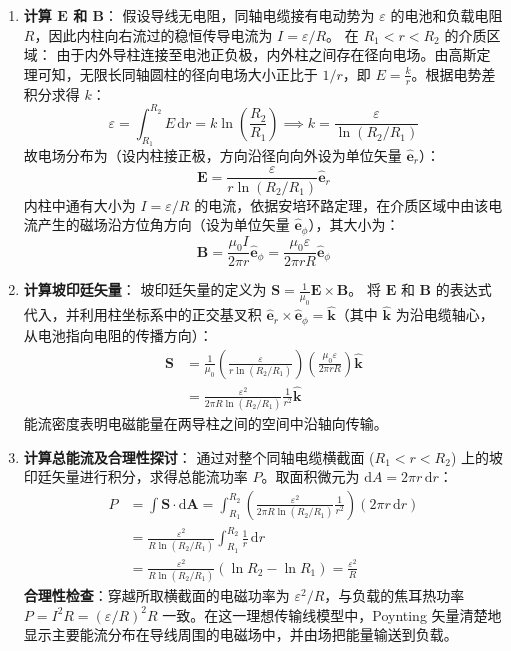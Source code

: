 \begin{solution}
\begin{enumerate}
    \item[(a)] \textbf{计算 $\boldsymbol{E}$ 和 $\boldsymbol{B}$}：
    假设导线无电阻，同轴电缆接有电动势为 $\varepsilon$ 的电池和负载电阻 $R$，因此内柱向右流过的稳恒传导电流为 $I = \varepsilon / R$。
    在 $R_1 < r < R_2$ 的介质区域：
    由于内外导柱连接至电池正负极，内外柱之间存在径向电场。由高斯定理可知，无限长同轴圆柱的径向电场大小正比于 $1/r$，即 $E = \frac{k}{r}$。根据电势差积分求得 $k$：
    $$ \varepsilon = \int_{R_1}^{R_2} E \, \mathrm{d}r = k \ln\left(\frac{R_2}{R_1}\right) \implies k = \frac{\varepsilon}{\ln(R_2/R_1)} $$
    故电场分布为（设内柱接正极，方向沿径向向外设为单位矢量 $\hat{\boldsymbol{e}}_r$）：
    $$ \boldsymbol{E} = \frac{\varepsilon}{r \ln(R_2/R_1)} \hat{\boldsymbol{e}}_r $$
    内柱中通有大小为 $I = \varepsilon / R$ 的电流，依据安培环路定理，在介质区域中由该电流产生的磁场沿方位角方向（设为单位矢量 $\hat{\boldsymbol{e}}_\phi$），其大小为：
    $$ \boldsymbol{B} = \frac{\mu_0 I}{2\pi r} \hat{\boldsymbol{e}}_\phi = \frac{\mu_0 \varepsilon}{2\pi r R} \hat{\boldsymbol{e}}_\phi $$

    \item[(b)] \textbf{计算坡印廷矢量}：
    坡印廷矢量的定义为 $\boldsymbol{S} = \frac{1}{\mu_0} \boldsymbol{E} \times \boldsymbol{B}$。
    将 $\boldsymbol{E}$ 和 $\boldsymbol{B}$ 的表达式代入，并利用柱坐标系中的正交基叉积 $\hat{\boldsymbol{e}}_r \times \hat{\boldsymbol{e}}_\phi = \hat{\boldsymbol{k}}$（其中 $\hat{\boldsymbol{k}}$ 为沿电缆轴心，从电池指向电阻的传播方向）：
    \[
    \begin{aligned}
    \boldsymbol{S} &= \frac{1}{\mu_0} \left( \frac{\varepsilon}{r \ln(R_2/R_1)} \right) \left( \frac{\mu_0 \varepsilon}{2\pi r R} \right) \hat{\boldsymbol{k}}\\
      &= \frac{\varepsilon^2}{2\pi R \ln(R_2/R_1)} \frac{1}{r^2} \hat{\boldsymbol{k}}
    \end{aligned}
    \]
    能流密度表明电磁能量在两导柱之间的空间中沿轴向传输。

    \item[(c)] \textbf{计算总能流及合理性探讨}：
    通过对整个同轴电缆横截面 ($R_1 < r < R_2$) 上的坡印廷矢量进行积分，求得总能流功率 $P$。取面积微元为 $\mathrm{d}A = 2\pi r \, \mathrm{d}r$：
    \begin{align*}
        P &= \int \boldsymbol{S} \cdot \mathrm{d}\boldsymbol{A} = \int_{R_1}^{R_2} \left( \frac{\varepsilon^2}{2\pi R \ln(R_2/R_1)} \frac{1}{r^2} \right) (2\pi r \, \mathrm{d}r) \\
          &= \frac{\varepsilon^2}{R \ln(R_2/R_1)} \int_{R_1}^{R_2} \frac{1}{r} \, \mathrm{d}r \\
          &= \frac{\varepsilon^2}{R \ln(R_2/R_1)} \left( \ln R_2 - \ln R_1 \right) = \frac{\varepsilon^2}{R}
    \end{align*}
    \textbf{合理性检查}：穿越所取横截面的电磁功率为 $\varepsilon^2/R$，与负载的焦耳热功率 $P=I^2R=(\varepsilon/R)^2R$ 一致。在这一理想传输线模型中，Poynting 矢量清楚地显示主要能流分布在导线周围的电磁场中，并由场把能量输送到负载。
\end{enumerate}
\end{solution}

